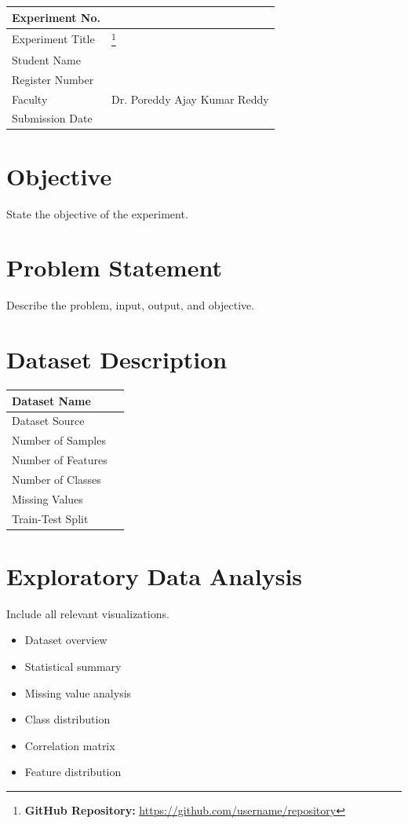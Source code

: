 \documentclass[12pt,a4paper]{article}
\begin{document}
\begin{tabular}{|p{4cm}|p{11cm}|}
\hline
Experiment No. & \\ \hline
Experiment Title &
\footnote{\textbf{GitHub Repository: }\url{https://github.com/username/repository}}\\ \hline
Student Name & \\ \hline
Register Number & \\ \hline
Faculty & Dr. Poreddy Ajay Kumar Reddy \\ \hline
Submission Date & \\ \hline
\end{tabular}

\section{Objective}
State the objective of the experiment.

\section{Problem Statement}
Describe the problem, input, output, and objective.

\section{Dataset Description}
\begin{longtable}{|p{6cm}|p{8cm}|}
\hline
Dataset Name & \\ \hline
Dataset Source & \\ \hline
Number of Samples & \\ \hline
Number of Features & \\ \hline
Number of Classes & \\ \hline
Missing Values & \\ \hline
Train-Test Split & \\ \hline
\end{longtable}

\section{Exploratory Data Analysis}
Include all relevant visualizations.
\begin{itemize}
\item Dataset overview
\item Statistical summary
\item Missing value analysis
\item Class distribution
\item Correlation matrix
\item Feature distribution
\end{itemize}
\end{document}
